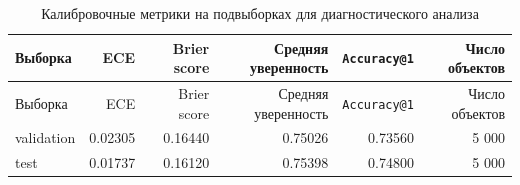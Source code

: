\begin{center}
\small
\begin{longtable}{p{} r r r r r}
\caption{Калибровочные метрики на подвыборках для диагностического анализа}
\label{tab:calibration-metrics}\\
\toprule
Выборка & ECE & Brier score & Средняя уверенность & \texttt{Accuracy@1} & Число объектов\\
\midrule
\endfirsthead

\toprule
Выборка & ECE & Brier score & Средняя уверенность & \texttt{Accuracy@1} & Число объектов\\
\midrule
\endhead

\bottomrule
\endlastfoot

validation & 0.02305 & 0.16440 & 0.75026 & 0.73560 & 5 000 \\
test & 0.01737 & 0.16120 & 0.75398 & 0.74800 & 5 000 \\

\end{longtable}
\end{center}